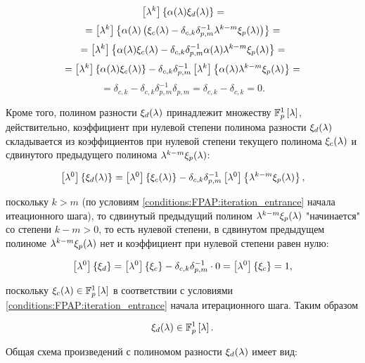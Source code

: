 	$$ \left [ \lambda^{k} \right ] \left \{ \alpha (\lambda) \xi_d (\lambda) \right \} = $$
	$$ = \left [ \lambda^{k} \right ] \left \{ \alpha (\lambda) \left ( \xi_c (\lambda) - \delta_{c,k} \delta_{p,m}^{-1} \lambda^{k-m} \xi_p (\lambda) \right )  \right \} = $$
	$$ = \left [ \lambda^{k} \right ] \left \{ \alpha (\lambda) \xi_c (\lambda)
		- \delta_{c,k} \delta_{p,m}^{-1} \alpha (\lambda) \lambda^{k-m} \xi_p (\lambda) \right \} = $$
	$$ = \left [ \lambda^{k} \right ] \left \{ \alpha (\lambda) \xi_c (\lambda) \right \}
		- \delta_{c,k} \delta_{p,m}^{-1} \left [ \lambda^{k} \right ] \left \{ \alpha (\lambda) \lambda^{k-m} \xi_p (\lambda) \right \} = $$
	\begin{equation} \label{equation:FPAP:annihilating_of_kth_degree_in_difference_polynomial_product}
		= \delta_{c,k} - \delta_{c,k} \delta_{p,m}^{-1} \delta_{p,m} = \delta_{c,k} - \delta_{c,k} = 0.
	\end{equation}

Кроме того, полином разности $\xi_d (\lambda)$ принадлежит множеству $\mathbb{F}_p^1 \left [ \lambda \right ]$, действительно, коэффициент при нулевой степени
полинома разности $\xi_d (\lambda)$ складывается из коэффициентов при нулевой степени текущего полинома $\xi_c (\lambda)$ и
сдвинутого предыдущего полинома $\lambda^{k-m} \xi_p (\lambda)$:

	$$ \left [ \lambda^{0} \right ] \left \{ \xi_d (\lambda) \right \}
		= \left [ \lambda^{0} \right ] \left \{ \xi_c (\lambda) \right \}
			- \delta_{c,k} \delta_{p,m}^{-1} \left [ \lambda^{0} \right ] \left \{ \lambda^{k-m} \xi_p (\lambda) \right \}, $$

поскольку $k > m$ (по условиям \ref{conditions:FPAP:iteration_entrance} начала итеационного шага), то сдвинутый предыдущий полином
$\lambda^{k-m} \xi_p (\lambda)$ "начинается"{} со степени $k-m > 0$, то есть нулевой степени, в сдвинутом предыдущем полиноме
$\lambda^{k-m} \xi_p (\lambda)$ нет и коэффициент при нулевой степени равен нулю:

	$$ \left [ \lambda^{0} \right ] \left \{ \xi_d \right \} = \left [ \lambda^{0} \right ] \left \{ \xi_c \right \} - \delta_{c,k} \delta_{p,m}^{-1} \cdot 0 = \left [ \lambda^{0} \right ] \left \{ \xi_c \right \} = 1, $$

поскольку $\xi_c (\lambda) \in \mathbb{F}_p^1 \left [ \lambda \right ]$ в соответствии с условиями \ref{conditions:FPAP:iteration_entrance} начала итерационного шага.
Таким образом

	\begin{equation} \label{equation:FPAP:difference_polynomial_belongs_to_unity_polynomials}
		\xi_d (\lambda) \in \mathbb{F}_p^1 \left [ \lambda \right ].
	\end{equation}

Общая схема произведений с полиномом разности $\xi_d (\lambda)$ имеет вид:

